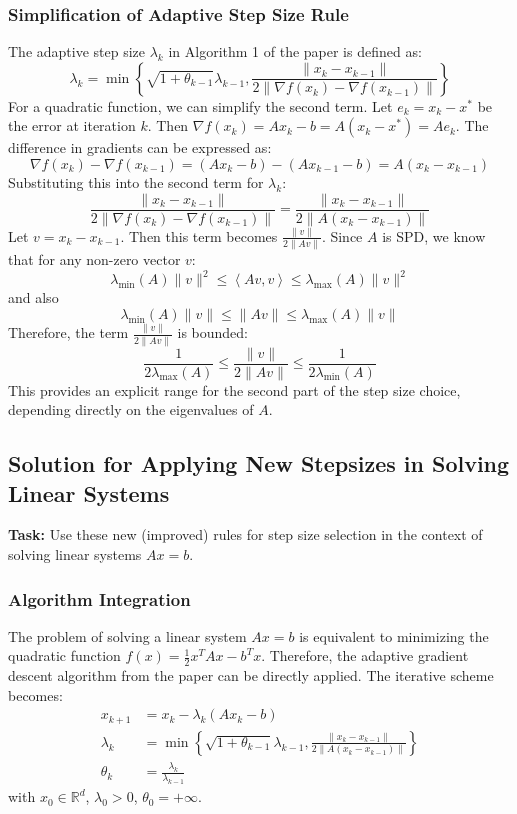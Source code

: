 \documentclass[11pt,a4paper,reqno]{article}
\newcommand{\R}{\mathbb{R}}
\newcommand{\lr}[1]{\left\langle #1\right\rangle}
\begin{document}
\subsubsection{Simplification of Adaptive Step Size Rule}
The adaptive step size $\lambda_k$ in Algorithm 1 of the paper is defined as:
$$ \lambda_k = \min \left\{ \sqrt{1 + \theta_{k-1}} \lambda_{k-1}, \frac{\|x_k - x_{k-1}\|}{2\|\nabla f(x_k) - \nabla f(x_{k-1})\|} \right\} $$
For a quadratic function, we can simplify the second term.
Let $e_k = x_k - x^*$ be the error at iteration $k$. Then $\nabla f(x_k) = Ax_k - b = A(x_k - x^*) = A e_k$.
The difference in gradients can be expressed as:
$$ \nabla f(x_k) - \nabla f(x_{k-1}) = (Ax_k - b) - (Ax_{k-1} - b) = A(x_k - x_{k-1}) $$
Substituting this into the second term for $\lambda_k$:
$$ \frac{\|x_k - x_{k-1}\|}{2\|\nabla f(x_k) - \nabla f(x_{k-1})\|} = \frac{\|x_k - x_{k-1}\|}{2\|A(x_k - x_{k-1})\|} $$
Let $v = x_k - x_{k-1}$. Then this term becomes $\frac{\|v\|}{2\|Av\|}$.
Since $A$ is SPD, we know that for any non-zero vector $v$:
$$ \lambda_{\min}(A) \|v\|^2 \le \lr{Av,v} \le \lambda_{\max}(A) \|v\|^2 $$
and also
$$ \lambda_{\min}(A) \|v\| \le \|Av\| \le \lambda_{\max}(A) \|v\| $$
Therefore, the term $\frac{\|v\|}{2\|Av\|}$ is bounded:
$$ \frac{1}{2\lambda_{\max}(A)} \le \frac{\|v\|}{2\|Av\|} \le \frac{1}{2\lambda_{\min}(A)} $$
This provides an explicit range for the second part of the step size choice, depending directly on the eigenvalues of $A$.


\subsection{Solution for Applying New Stepsizes in Solving Linear Systems}
\label{sec:application_solution}

\textbf{Task:} Use these new (improved) rules for step size selection in the context of solving linear systems $Ax=b$.

\subsubsection{Algorithm Integration}
The problem of solving a linear system $Ax=b$ is equivalent to minimizing the quadratic function $f(x) = \frac 12 x^T A x - b^T x$. Therefore, the adaptive gradient descent algorithm from the paper can be directly applied.
The iterative scheme becomes:
\begin{align*}
  x_{k+1} &= x_k - \lambda_k (Ax_k - b) \\
  \lambda_k &= \min \left\{ \sqrt{1 + \theta_{k-1}} \lambda_{k-1}, \frac{\|x_k - x_{k-1}\|}{2\|A(x_k - x_{k-1})\|} \right\} \\
  \theta_k &= \frac{\lambda_k}{\lambda_{k-1}}
\end{align*}
with $x_0 \in \R^d$, $\lambda_0 > 0$, $\theta_0 = +\infty$.
\end{document}

